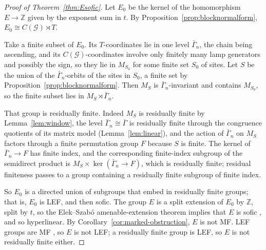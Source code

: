 \documentclass[11pt]{amsart}
\theoremstyle{definition}
\theoremstyle{remark}
\theoremstyle{plain}
\newcommand{\Z}{\mathbb Z}
\begin{document}
\begin{proof}[Proof of Theorem~\ref{thm:Esofic}]
Let $E_0$ be the kernel of the homomorphism $E\to\Z$ given by the
exponent sum in $t$.  By
Proposition~\ref{prop:blocknormalform}, $E_0\cong C(\mathcal G)\rtimes
T$.

Take a finite subset of $E_0$.  Its $T$-coordinates lie in one level
$\bar\Gamma_n$, the chain being ascending, and its
$C(\mathcal G)$-coordinates involve only finitely many lamp generators
and possibly the sign, so they lie in $M_{S_0}$ for some finite set
$S_0$ of sites.  Let
$S$ be the union of the $\bar\Gamma_n$-orbits of the sites in $S_0$, a
finite set by Proposition~\ref{prop:blocknormalform}.  Then $M_S$ is
$\bar\Gamma_n$-invariant and contains $M_{S_0}$, so the finite subset lies
in $M_S\rtimes\bar\Gamma_n$.

That group is residually finite.  Indeed $M_S$ is residually finite by
Lemma~\ref{lem:window}, the level $\bar\Gamma_n\cong\bar\Gamma$ is
residually finite through the congruence quotients of its matrix model
(Lemma~\ref{lem:linear}), and the action of $\bar\Gamma_n$ on $M_S$
factors through a finite permutation group $F$ because $S$ is finite.
The kernel of $\bar\Gamma_n\to F$ has finite index, and the
corresponding finite-index subgroup of the semidirect product is
$M_S\times\ker(\bar\Gamma_n\to F)$, which is residually finite;
residual finiteness passes to a group containing a residually finite
subgroup of finite index.

So $E_0$ is a directed union of subgroups that embed in residually
finite groups; that is, $E_0$ is LEF, and then sofic.  The group
$E$ is a split extension of $E_0$ by $\Z$, split by $t$, so the
Elek--Szab\'o amenable-extension theorem implies that $E$ is sofic
\cite{ElekSzabo}, and so hyperlinear.  By Corollary~\ref{cor:marked-obstruction}, $E$
is not MF\@.  LEF groups are MF \cite{CDE}, so $E$ is not LEF; a
residually finite group is LEF, so $E$ is not residually finite
either.
\end{proof}
\end{document}
